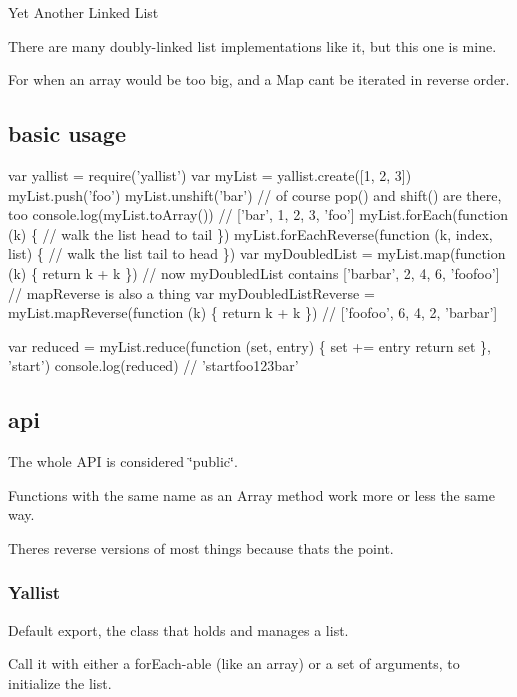 Yet Another Linked List

There are many doubly-\/linked list implementations like it, but this one is mine.

For when an array would be too big, and a Map can\textquotesingle{}t be iterated in reverse order.

\href{https://travis-ci.org/isaacs/yallist}{\tt } \href{https://coveralls.io/github/isaacs/yallist}{\tt }

\subsection*{basic usage}


\begin{DoxyCode}
var yallist = require('yallist')
var myList = yallist.create([1, 2, 3])
myList.push('foo')
myList.unshift('bar')
// of course pop() and shift() are there, too
console.log(myList.toArray()) // ['bar', 1, 2, 3, 'foo']
myList.forEach(function (k) \{
  // walk the list head to tail
\})
myList.forEachReverse(function (k, index, list) \{
  // walk the list tail to head
\})
var myDoubledList = myList.map(function (k) \{
  return k + k
\})
// now myDoubledList contains ['barbar', 2, 4, 6, 'foofoo']
// mapReverse is also a thing
var myDoubledListReverse = myList.mapReverse(function (k) \{
  return k + k
\}) // ['foofoo', 6, 4, 2, 'barbar']

var reduced = myList.reduce(function (set, entry) \{
  set += entry
  return set
\}, 'start')
console.log(reduced) // 'startfoo123bar'
\end{DoxyCode}


\subsection*{api}

The whole A\+PI is considered \char`\"{}public\char`\"{}.

Functions with the same name as an Array method work more or less the same way.

There\textquotesingle{}s reverse versions of most things because that\textquotesingle{}s the point.

\subsubsection*{Yallist}

Default export, the class that holds and manages a list.

Call it with either a for\+Each-\/able (like an array) or a set of arguments, to initialize the list.

